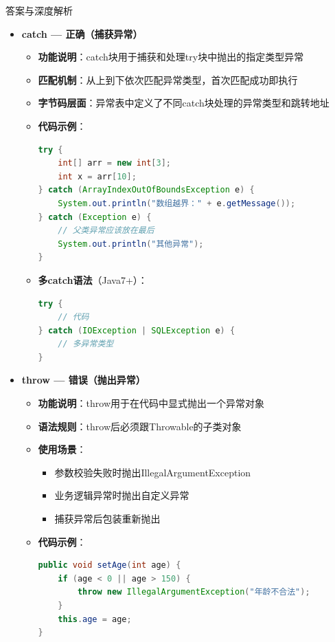 \documentclass[12pt, a4paper]{ctexart}
\begin{document}
\begin{enumerate}[label=\textbf{\arabic*.}]
\begin{bluebox}{答案与深度解析}
\begin{itemize}[leftmargin=*, nosep, label={}]
			      \item[B] \textbf{catch — 正确（捕获异常）}
			            \begin{itemize}[label={}, leftmargin=*, nosep]
				            \item \textbf{功能说明}：catch块用于捕获和处理try块中抛出的指定类型异常
				            \item \textbf{匹配机制}：从上到下依次匹配异常类型，首次匹配成功即执行
				            \item \textbf{字节码层面}：异常表中定义了不同catch块处理的异常类型和跳转地址
				            \item \textbf{代码示例}：
				                  \begin{lstlisting}[language=Java]
try {
    int[] arr = new int[3];
    int x = arr[10];
} catch (ArrayIndexOutOfBoundsException e) {
    System.out.println("数组越界：" + e.getMessage());
} catch (Exception e) {
    // 父类异常应该放在最后
    System.out.println("其他异常");
}
				            \end{lstlisting}
				            \item \textbf{多catch语法}（Java7+）：
				                  \begin{lstlisting}[language=Java]
try {
    // 代码
} catch (IOException | SQLException e) {
    // 多异常类型
}
				            \end{lstlisting}
			            \end{itemize}

			      \item[C] \textbf{throw — 错误（抛出异常）}
			            \begin{itemize}[label={}, leftmargin=*, nosep]
				            \item \textbf{功能说明}：throw用于在代码中显式抛出一个异常对象
				            \item \textbf{语法规则}：throw后必须跟Throwable的子类对象
				            \item \textbf{使用场景}：
				                  \begin{itemize}[label={}, nosep]
					                  \item 参数校验失败时抛出IllegalArgumentException
					                  \item 业务逻辑异常时抛出自定义异常
					                  \item 捕获异常后包装重新抛出
				                  \end{itemize}
				            \item \textbf{代码示例}：
				                  \begin{lstlisting}[language=Java]
public void setAge(int age) {
    if (age < 0 || age > 150) {
        throw new IllegalArgumentException("年龄不合法");
    }
    this.age = age;
}


\end{lstlisting}
\end{itemize}
\end{itemize}
\end{bluebox}
\end{enumerate}
\end{document}
